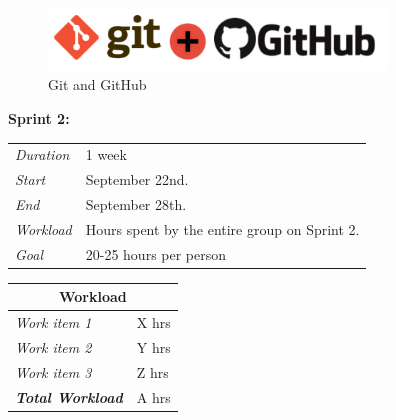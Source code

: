 \documentclass[11pt]{report}
\begin{document}

\begin{figure}[ht!]
\centering
\includegraphics[width=90mm]{./Sprint2/img/Sprint2-GitnGithub.png}
\caption{Git and GitHub \label{overflow}}
\end{figure}






\begin{minipage}{\linewidth}
\centering
\setlength{\tabcolsep}{22pt}
\textbf{Sprint 2:} 
\smallskip
{}
\begin{tabular}{ |l l| }
	\hline
	\it{Duration} & 1 week \\
	\it{Start} & September 22nd. \\
	\it{End} & September 28th. \\
	\it{Workload} & Hours spent by the entire group on Sprint 2. \\
	\it{Goal} & 20-25 hours per person \\
	\hline
\end{tabular}
\end{minipage}




\begin{minipage}{\linewidth}
\setlength{\tabcolsep}{15pt}
\centering
{}
\begin{tabular}{ |l|l| }
	\hline
	\multicolumn{2}{|c|}{\cellcolor{gray!25} Workload} \\
	\hline
	\it{Work item 1} & X hrs\\
	\it{Work item 2} & Y hrs\\
	\it{Work item 3} & Z hrs\\
	\hline
	\textbf{\textit{Total Workload}} & A hrs\\
	\hline
\end{tabular}
\end{minipage}
\end{document}
